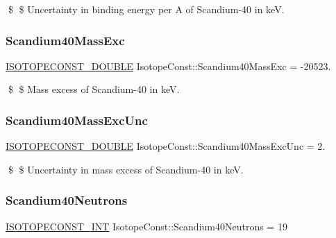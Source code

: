 \$ \$ Uncertainty in binding energy per A of Scandium-\/40 in keV. \mbox{\label{group___isotope_const-_scandium-_sc40_ga17b8d48cb785e585bd1f3237d5314db3}} 
\subsubsection{\texorpdfstring{Scandium40\+Mass\+Exc}{Scandium40MassExc}}
{\footnotesize\ttfamily \mbox{\hyperlink{group___isotope_const-_macros_ga8f45a7272ce02c0b4c65c44636ed719a}{I\+S\+O\+T\+O\+P\+E\+C\+O\+N\+S\+T\+\_\+\+D\+O\+U\+B\+LE}} Isotope\+Const\+::\+Scandium40\+Mass\+Exc = -\/20523.}

\$ \$ Mass excess of Scandium-\/40 in keV. \mbox{\label{group___isotope_const-_scandium-_sc40_ga6e32f542a3cf621c9a105d6308ffb95a}} 
\subsubsection{\texorpdfstring{Scandium40\+Mass\+Exc\+Unc}{Scandium40MassExcUnc}}
{\footnotesize\ttfamily \mbox{\hyperlink{group___isotope_const-_macros_ga8f45a7272ce02c0b4c65c44636ed719a}{I\+S\+O\+T\+O\+P\+E\+C\+O\+N\+S\+T\+\_\+\+D\+O\+U\+B\+LE}} Isotope\+Const\+::\+Scandium40\+Mass\+Exc\+Unc = 2.}

\$ \$ Uncertainty in mass excess of Scandium-\/40 in keV. \mbox{\label{group___isotope_const-_scandium-_sc40_gad27f936326d1a9effa6ad2a732387209}} 
\subsubsection{\texorpdfstring{Scandium40\+Neutrons}{Scandium40Neutrons}}
{\footnotesize\ttfamily \mbox{\hyperlink{group___isotope_const-_macros_ga5f18360b3e99483a35c32d789e62621c}{I\+S\+O\+T\+O\+P\+E\+C\+O\+N\+S\+T\+\_\+\+I\+NT}} Isotope\+Const\+::\+Scandium40\+Neutrons = 19}

